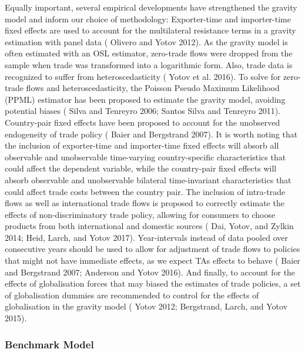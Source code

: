 \documentclass[12pt]{article}%
\begin{document}
Equally important, several empirical developments have strengthened the
gravity model and inform our choice of methodology: Exporter-time and
importer-time fixed effects are used to account for the multilateral
resistance terms in a gravity estimation with panel data (\cite{olivero_dynamic_2012} Olivero and
Yotov 2012). As the gravity model is often estimated with an OSL
estimator, zero-trade flows were dropped from the sample when trade was
transformed into a logarithmic form. Also, trade data is recognized to
suffer from heteroscedasticity (\cite{yotov_advanced_2016} Yotov et al. 2016). To solve for
zero-trade flows and heteroscedasticity, the Poisson Pseudo Maximum
Likelihood (PPML) estimator has been proposed to estimate the gravity
model, avoiding potential biases (\cite{silva_log_2006} Silva and Tenreyro 2006; \cite{santos_silva_further_2011} Santos Silva
and Tenreyro 2011). Country-pair fixed effects have been proposed to
account for the unobserved endogeneity of trade policy (\cite{baier_free_2007-1} Baier and
Bergstrand 2007). It is worth noting that the inclusion of
exporter-time and importer-time fixed effects will absorb all observable
and unobservable time-varying country-specific characteristics that
could affect the dependent variable, while the country-pair fixed
effects will absorb observable and unobservable bilateral time-invariant
characteristics that could affect trade costs between the country pair. The inclusion of
intra-trade flows as well as international trade flows is proposed to
correctly estimate the effects of non-discriminatory trade policy,
allowing for consumers to choose products from both international and
domestic sources (\cite{dai_trade-diversion_2014} Dai, Yotov, and Zylkin 2014; \cite{heid_estimating_2017} Heid, Larch, and Yotov
2017). Year-intervals instead of data pooled over consecutive years
should be used to allow for adjustment of trade flows to policies that
might not have immediate effects, as we expect TAs effects to behave (\cite{baier_free_2007-2} Baier and Bergstrand 2007; \cite{anderson_terms_2016-1} Anderson
and Yotov 2016). And finally, to account for the effects of
globalisation forces that may biased the estimates of trade policies, a
set of globalisation dummies are recommended to control for the effects
of globalisation in the gravity model (\cite{yotov_simple_2012} Yotov 2012; \cite{bergstrand_economic_2015} Bergstrand, Larch,
and Yotov 2015).%
\subsubsection{Benchmark Model}%
\label{ssubsec:BenchmarkModel}%
\end{document}
